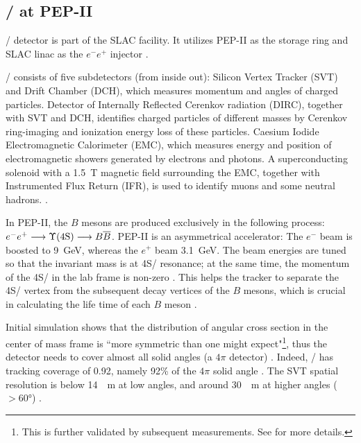 \subsection{\BaBar/ at PEP-II}
\BaBar/ detector is part of the SLAC facility.
It utilizes PEP-II as the storage ring and SLAC linac as the $e^-e^+$
injector \cite{Harrison:1998yr}.

\BaBar/ consists of five subdetectors (from inside out):
Silicon Vertex Tracker (SVT) and Drift Chamber (DCH), which measures momentum
and angles of charged particles.
Detector of Internally
Reflected Cerenkov radiation (DIRC), together with SVT and DCH, identifies
charged particles of different masses by Cerenkov ring-imaging and ionization
energy loss of these particles.
Caesium Iodide Electromagnetic Calorimeter (EMC), which measures energy and
position of electromagnetic showers generated by electrons and photons.
A superconducting solenoid with a \SI{1.5}{T} magnetic field surrounding the
EMC, together with Instrumented Flux Return (IFR), is used to identify muons and
some neutral hadrons. \cite{Lees:2013uzd}.

In PEP-II, the $B$ mesons are produced exclusively in the following process:
$e^- e^+ \longrightarrow \Y4S/ \longrightarrow B \overline{B}$.
PEP-II is an asymmetrical accelerator: The $e^-$ beam is boosted to \SI{9}{GeV},
whereas the $e^+$ beam \SI{3.1}{GeV}.
The beam energies are tuned so that the invariant mass is at \Y4S/ resonance;
at the same time, the momentum of the \Y4S/ in the lab frame is
non-zero \cite{Harrison:1998yr}.
This helps the tracker to separate the \Y4S/ vertex from the subsequent decay
vertices of the $B$ mesons, which is crucial in calculating the life time of
each $B$ meson \cite{McGregor:2008ek}.

Initial simulation shows that the distribution of angular cross section in the
center of mass frame is ``more symmetric than one might expect"\footnote{
    This is further validated by subsequent measurements.
    See \cite{McGregor:2008ek} for more details.
}, thus the
detector needs to cover almost all solid angles
(a $4\pi$ detector) \cite{Boutigny:1995ib}.
Indeed, \BaBar/ has tracking coverage of 0.92, namely 92\% of the $4\pi$ solid
angle \cite{Harrison:1998yr}.
The SVT spatial resolution is below \SI{14}{\mu m} at low angles, and around
\SI{30}{\mu m} at higher angles ($> \ang{60}$) \cite{Harrison:1998yr}.


